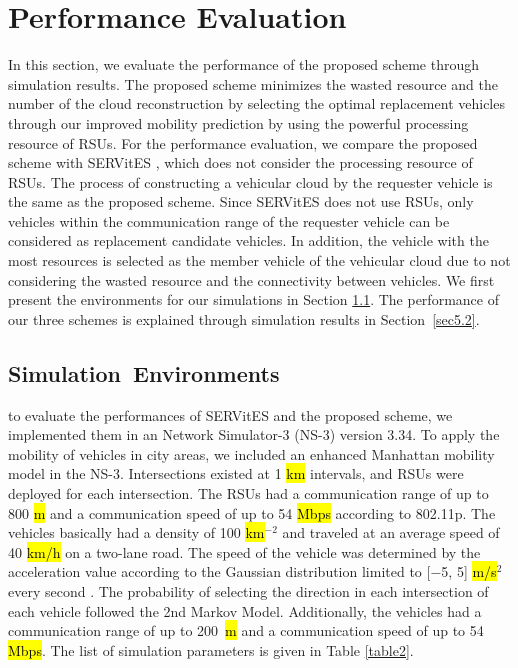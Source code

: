 \documentclass[electronics,aricle,accept,pdftex,moreauthors]{Definitions/mdpi}
\begin{document}
\section{Performance Evaluation} \label{per}
In this section, we evaluate the performance of the proposed scheme through simulation results.
The proposed scheme minimizes the wasted resource and the number of the cloud reconstruction by selecting the optimal replacement vehicles through our improved mobility prediction by using the powerful processing resource of RSUs.
For the performance evaluation, we compare the proposed scheme with SERVitES \cite{Meneguette2017j}, which does not consider the processing resource of RSUs.
The process of constructing a vehicular cloud by the requester vehicle is the same as the proposed scheme.
Since SERVitES does not use RSUs, only vehicles within the communication range of the requester vehicle can be considered as replacement candidate vehicles.
In addition, the vehicle with the most resources is selected as the member vehicle of the vehicular cloud due to not considering the wasted resource and the connectivity between vehicles.
We first present the environments for our simulations in Section \ref{sec5.1}.
The performance of our three schemes is explained through simulation results in Section~\ref{sec5.2}.

\subsection{Simulation~Environments} \label{sec5.1}
to evaluate the performances of SERVitES and the proposed scheme, we implemented them in an Network Simulator-3 (NS-3) version 3.34.
To apply the mobility of vehicles in city areas, we included an enhanced Manhattan mobility model in the NS-3.
Intersections existed at 1 \hl{km} %
 intervals, and RSUs were deployed for each intersection.
The RSUs had a communication range of up to 800 \hl{m} and a communication speed of up to 54 \hl{Mbps} according to 802.11p.
The vehicles basically had a density of 100 {\hl{km}}$^{-2}$ and traveled at an average speed of 40 \hl{km/h} on a two-lane road.
The speed of the vehicle was determined by the acceleration value according to the Gaussian distribution limited to [$-$5, 5] \hl{m/{s}}$^{2}$ every second \cite{Robert2018, Yen2020}.
The probability of selecting the direction in each intersection of each vehicle followed the 2nd Markov Model.
Additionally, the vehicles had a communication range of up to 200~\hl{m} and a communication speed of up to 54 \hl{Mbps}.
The list of simulation parameters is given in Table \ref{table2}.
\end{document}
